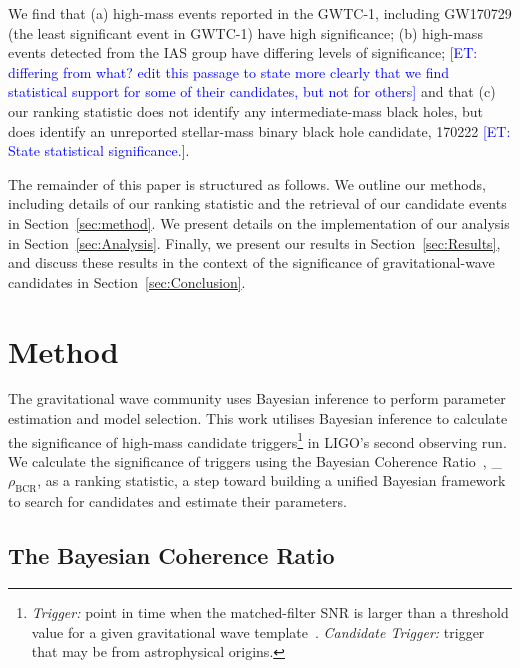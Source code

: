 \documentclass[%
 nofootinbib,
 amsmath,amssymb,
 aps,
 twocolumn
]{revtex4-2}
\newcommand{\mathcmd}[1]{{\sc \relax\ifmmode#1\else $#1$\fi}\xspace}
\newcommand{\bcr}{\mathcmd{\rho_\text{BCR}}}
\newcommand{\et}[1]{\textcolor{blue}{[ET: #1]}}
\begin{document}
We find that (a) high-mass events reported in the GWTC-1, including GW170729 (the least significant event in GWTC-1) have high significance; (b) high-mass events detected from the IAS group have differing levels of significance; \et{differing from what? edit this passage to state more clearly that we find statistical support for some of their candidates, but not for others} and that (c) our ranking statistic does not identify any intermediate-mass black holes, but does identify an unreported stellar-mass binary black hole candidate, 170222 \et{State statistical significance.}.

The remainder of this paper is structured as follows. We outline our methods, including details of our ranking statistic and the retrieval of our candidate events in Section~\ref{sec:method}. We present details on the implementation of our analysis in Section~\ref{sec:Analysis}. Finally, we present our results in Section~\ref{sec:Results}, and discuss these results in the context of the significance of gravitational-wave candidates in Section~\ref{sec:Conclusion}.






\section{Method\label{sec:method}}

The gravitational wave community uses Bayesian inference to perform parameter estimation and model selection. This work utilises Bayesian inference to calculate the significance of high-mass candidate triggers\footnote{\textit{Trigger:} point in time when the matched-filter SNR is larger than a threshold value for a given gravitational wave template~\cite{pycbc_og1}. \textit{Candidate Trigger:} trigger that may be from astrophysical origins.} in LIGO's second observing run. We calculate the significance of triggers using the Bayesian Coherence Ratio~\cite{BCR1}, \bcr, as a ranking statistic, a step toward building a unified Bayesian framework to search for candidates and estimate their parameters.


\subsection{The Bayesian Coherence Ratio}
\end{document}
